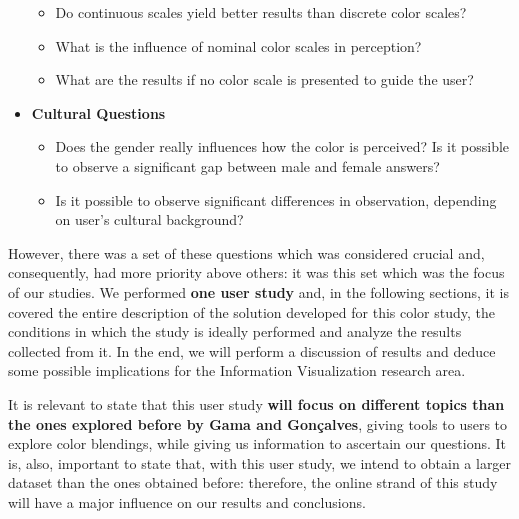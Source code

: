 \begin{itemize}
    \begin{itemize}
    	\setlength\itemsep{0.1em}
			\item Do continuous scales yield better results than discrete color scales?
      \item What is the influence of nominal color scales in perception?
      \item What are the results if no color scale is presented to guide the user?
		\end{itemize}
  \item \textbf{Cultural Questions}
    \begin{itemize}
    	\setlength\itemsep{0.01em}
			\item Does the gender really influences how the color is perceived? Is it possible to observe a significant gap between
			male and female answers?
			\item Is it possible to observe significant differences in observation, depending on user's cultural background?
		\end{itemize}
\end{itemize} \par
%
However, there was a set of these questions which was considered crucial and, consequently,
had more priority above others: it was this set which was the focus of our studies. We performed \textbf{one user study} and,
in the following sections, it is covered the entire description of the solution developed for this color study, the conditions in which
the study is ideally performed and analyze the results collected from it. In the end, we will perform a discussion of results and deduce
some possible implications for the Information Visualization research area. \par
%
It is relevant to state that this user study \textbf{will focus on different topics than the ones explored before by Gama and Gonçalves},
giving tools to users to explore color blendings, while giving us information to ascertain our questions. It is, also, important to state
that, with this user study, we intend to obtain a larger dataset than the ones obtained before: therefore, the online strand of this study
will have a major influence on our results and conclusions.
%
